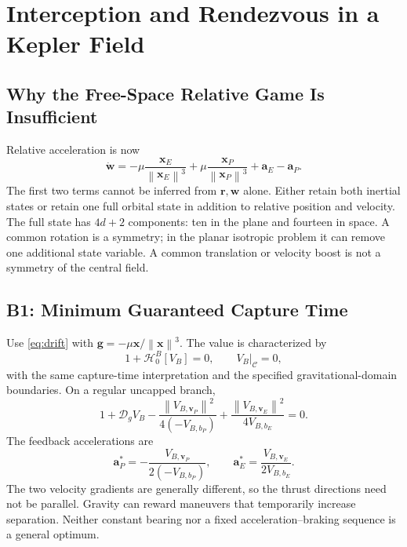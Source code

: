 \documentclass[journal,a4paper]{IEEEtran}
\newcommand{\C}{\mathcal C}
\newcommand{\D}{\mathcal D}
\newcommand{\HH}{\mathcal H}
\newcommand{\norm}[1]{\left\|#1\right\|}
\begin{document}
\section{Interception and Rendezvous in a Kepler Field}
\label{sec:kepler}
\subsection{Why the Free-Space Relative Game Is Insufficient}
Relative acceleration is now
\begin{equation}
 \dot{\mathbf w}
 =-\mu\frac{\mathbf x_E}{\norm{\mathbf x_E}^3}
  +\mu\frac{\mathbf x_P}{\norm{\mathbf x_P}^3}
  +\mathbf a_E-\mathbf a_P.
 \label{eq:tidal}
\end{equation}
The first two terms cannot be inferred from $\mathbf r,\mathbf w$ alone. Either retain both inertial states or retain one full orbital state in addition to relative position and velocity. The full state has $4d+2$ components: ten in the plane and fourteen in space. A common rotation is a symmetry; in the planar isotropic problem it can remove one additional state variable. A common translation or velocity boost is not a symmetry of the central field.

\subsection{B1: Minimum Guaranteed Capture Time}
Use \eqref{eq:drift} with $\mathbf g=-\mu\mathbf x/\norm{\mathbf x}^3$. The value is characterized by
\begin{equation}
 \boxed{1+\HH^B_0[V_B]=0,\qquad V_B|_\C=0,}
 \label{eq:B1}
\end{equation}
with the same capture-time interpretation and the specified gravitational-domain boundaries. On a regular uncapped branch,
\begin{equation}
 1+\D_g V_B
 -\frac{\norm{V_{B,\mathbf v_P}}^2}{4(-V_{B,b_P})}
 +\frac{\norm{V_{B,\mathbf v_E}}^2}{4V_{B,b_E}}=0.
 \label{eq:B1expanded}
\end{equation}
The feedback accelerations are
\begin{equation}
 \boxed{\mathbf a_P^*=-\frac{V_{B,\mathbf v_P}}{2(-V_{B,b_P})},\qquad
        \mathbf a_E^*= \frac{V_{B,\mathbf v_E}}{2V_{B,b_E}}.}
 \label{eq:B1feedback}
\end{equation}
The two velocity gradients are generally different, so the thrust directions need not be parallel. Gravity can reward maneuvers that temporarily increase separation. Neither constant bearing nor a fixed acceleration--braking sequence is a general optimum.
\end{document}
